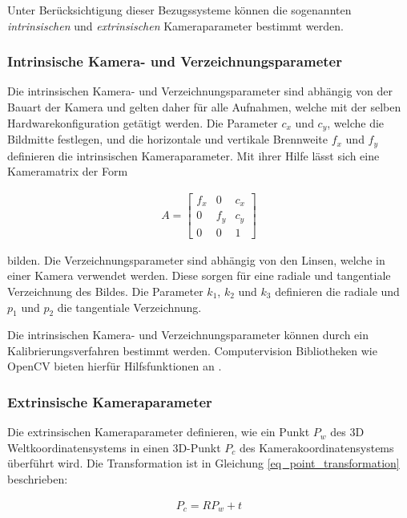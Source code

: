Unter Berücksichtigung dieser Bezugssysteme können die sogenannten \textit{intrinsischen} und
\textit{extrinsischen} Kameraparameter bestimmt werden.

\subsubsection{Intrinsische Kamera- und Verzeichnungsparameter}

Die intrinsischen Kamera- und Verzeichnungsparameter sind abhängig von der Bauart der Kamera und gelten
daher für alle Aufnahmen, welche mit der selben Hardwarekonfiguration getätigt werden.
Die Parameter $c_x$ und $c_y$, welche die Bildmitte festlegen, und die
horizontale und vertikale Brennweite $f_x$ und $f_y$ definieren die intrinsischen Kameraparameter.
Mit ihrer Hilfe lässt sich eine Kameramatrix der Form

\begin{ceqn}
\begin{align}
A =
 \begin{bmatrix}
  f_x & 0 & c_x \\
  0 & f_y & c_y \\
  0 & 0 & 1
 \end{bmatrix}
\end{align}
\end{ceqn}

bilden.
Die Verzeichnungsparameter sind abhängig von den Linsen, welche in einer Kamera verwendet werden. Diese sorgen
für eine radiale und tangentiale Verzeichnung des Bildes. Die Parameter $k_1$, $k_2$ und $k_3$ definieren die
radiale und $p_1$ und $p_2$ die tangentiale Verzeichnung. \cite[]{Meissner2007}

Die intrinsischen Kamera- und Verzeichnungsparameter können durch ein Kalibrierungsverfahren bestimmt werden.
Computervision Bibliotheken wie OpenCV bieten hierfür Hilfsfunktionen an \cite[]{DevTeamOpenCV2018}.

\subsubsection{Extrinsische Kameraparameter}

Die extrinsischen Kameraparameter definieren, wie ein Punkt $P_w$ des 3D Weltkoordinatensystems in einen 3D-Punkt $P_c$
des Kamerakoordinatensystems überführt wird. Die Transformation ist in Gleichung \ref{eq_point_transformation}
beschrieben:

\begin{ceqn}
\begin{align}
\label{eq_point_transformation}
    P_c = R P_w + t
\end{align}
\end{ceqn}

